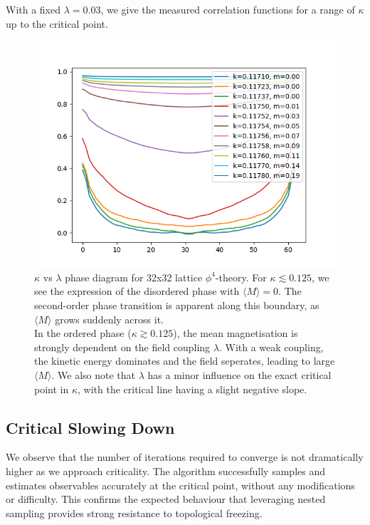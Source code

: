 \documentclass[11pt]{article}
\begin{document}
    With a fixed $\lambda=0.03$, we give the measured correlation functions for a range
    of $\kappa$ up to the critical point.

\begin{figure}[t!]
    \center
    \includegraphics[width=\linewidth]{../figures/correlations_n64}
    \caption{
        $\kappa$ vs $\lambda$ phase diagram for 32x32 lattice $\phi^4$-theory.
        For $\kappa \lesssim 0.125$, we see the expression of the disordered phase with $\langle M \rangle = 0$.
        The second-order phase transition is apparent along this boundary, as $\langle M \rangle$ grows suddenly
        across it. \\
        In the ordered phase ($\kappa \gtrsim 0.125$), the mean magnetisation is strongly dependent on the field
        coupling $\lambda$.
        With a weak coupling, the kinetic energy dominates and the field seperates, leading to
        large $\langle M \rangle$.
        We also note that $\lambda$ has a minor influence on the exact critical point in $\kappa$, with the
        critical line having a slight negative slope.
    }\label{fig:correlation_functions}
\end{figure}


\subsection{Critical Slowing Down}\label{subsec:critical_slowing_down}
We observe that the number of iterations required to converge is not dramatically higher as we approach criticality.
The algorithm successfully samples and estimates observables accurately at the critical point, without any
modifications or difficulty.
This confirms the expected behaviour that leveraging nested sampling provides strong resistance to topological freezing.
\end{document}
